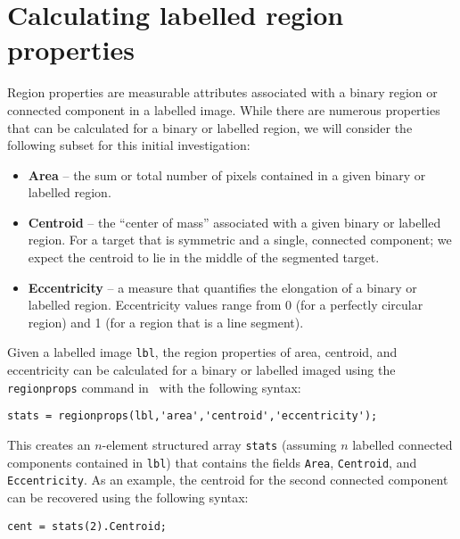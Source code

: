 \documentclass{tufte-handout}
\begin{document}
\section{Calculating labelled region properties}
Region properties are measurable attributes associated with a binary region or connected component in a labelled image. While there are numerous properties that can be calculated for a binary or labelled region, we will consider the following subset for this initial investigation: 
\begin{itemize}
\item \textbf{Area} -- the sum or total number of pixels contained in a given binary or labelled region. 
\item \textbf{Centroid} -- the ``center of mass'' associated with a given binary or labelled region. For a target that is symmetric and a single, connected component; we expect the centroid to lie in the middle of the segmented target.
\item \textbf{Eccentricity} -- a measure that quantifies the elongation of a binary or labelled region. Eccentricity values range from 0 (for a perfectly circular region) and 1 (for a region that is a line segment).
\end{itemize}

Given a labelled image \lstinline{lbl}, the region properties of area, centroid, and eccentricity can be calculated for a binary or labelled imaged using the \lstinline{regionprops} command in \Matlab\ with the following syntax:
\begin{lstlisting}[style=usnaMatlab]
stats = regionprops(lbl,'area','centroid','eccentricity');
\end{lstlisting}
This creates an $n$-element structured array \lstinline{stats} (assuming $n$ labelled connected components contained in \lstinline{lbl}) that contains the fields \lstinline{Area}, \lstinline{Centroid}, and \lstinline{Eccentricity}. As an example, the centroid for the second connected component can be recovered using the following syntax:
\begin{lstlisting}[style=usnaMatlab]
cent = stats(2).Centroid;
\end{lstlisting}
\end{document}
